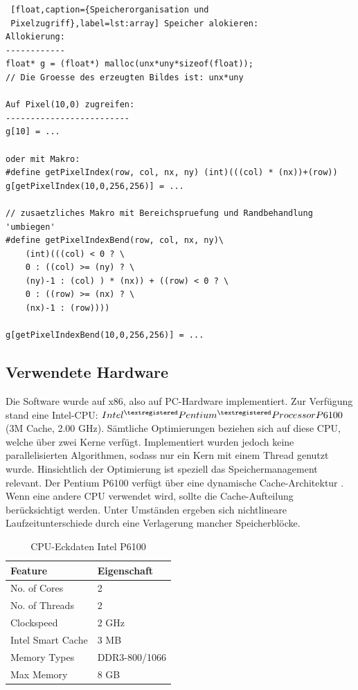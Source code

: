 \documentclass[a4paper,12pt]{article}
\begin{document}
 \begin{lstlisting} [float,caption={Speicherorganisation und
 Pixelzugriff},label=lst:array] Speicher alokieren:
Allokierung:
------------
float* g = (float*) malloc(unx*uny*sizeof(float));
// Die Groesse des erzeugten Bildes ist: unx*uny

Auf Pixel(10,0) zugreifen:
-------------------------
g[10] = ...
 
oder mit Makro:
#define getPixelIndex(row, col, nx, ny) (int)(((col) * (nx))+(row))
g[getPixelIndex(10,0,256,256)] = ...

// zusaetzliches Makro mit Bereichspruefung und Randbehandlung 'umbiegen'
#define getPixelIndexBend(row, col, nx, ny)\
	(int)(((col) < 0 ? \
	0 : ((col) >= (ny) ? \
	(ny)-1 : (col) ) * (nx)) + ((row) < 0 ? \
	0 : ((row) >= (nx) ? \
	(nx)-1 : (row))))

g[getPixelIndexBend(10,0,256,256)] = ...
\end{lstlisting}


\subsection{Verwendete Hardware}
Die Software wurde auf x86, also auf PC-Hardware implementiert. Zur Verfügung
stand eine Intel-CPU: $Intel^{\textregistered} Pentium^{\textregistered}
Processor P6100$ (3M Cache, 2.00 GHz). Sämtliche Optimierungen beziehen
sich auf diese CPU, welche über zwei Kerne verfügt. Implementiert wurden jedoch
keine parallelisierten Algorithmen, sodass nur ein Kern mit einem Thread
genutzt wurde.
 Hinsichtlich der Optimierung ist speziell das Speichermanagement relevant. Der
 Pentium P6100 verfügt über eine dynamische Cache-Architektur \cite{intel}. 
 Wenn eine andere CPU verwendet wird, sollte die Cache-Aufteilung
berücksichtigt werden. Unter Umständen ergeben sich nichtlineare
Laufzeitunterschiede durch eine Verlagerung mancher Speicherblöcke.



\begin{table}[htbp]
\begin{center}
\begin{tabular}{ | l | l |}
\hline
Feature			& Eigenschaft \\ \hline
No. of Cores			&	2 \\
No. of Threads		&	2 \\
Clockspeed	&	2 GHz \\
Intel Smart Cache		&	3 MB \\
Memory Types		&	DDR3-800/1066 \\
Max Memory			&	8 GB \\ \hline
\end{tabular}
\caption{CPU-Eckdaten Intel P6100\cite{intel}}
\label{tab:cpu}
\end{center}
\end{table}
\end{document}
